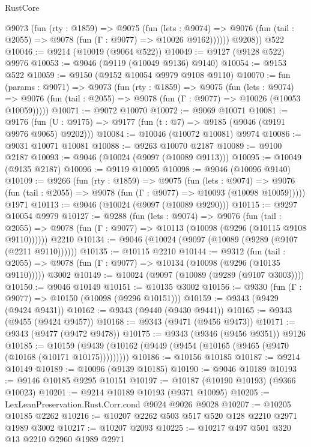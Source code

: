 \begin{lexlean}{RustCore}
\begin{coremodule}
          @9073
            (fun (rty : @1859) =>
            @9075
              (fun (lets : @9074) =>
              @9076 (fun (tail : @2055) => @9078 (fun (Γ : @9077) => @10026 @9162))))))
        @9208))
    @522
@10046 := @9214 (@10019 (@9064 @522))
@10049 := @9127 (@9128 @522) @9976
@10053 := @9046 (@9119 (@10049 @9136) @9140)
@10054 := @9153 @522
@10059 := @9150 (@9152 @10054 @9979 @9108 @9110)
@10070 := fun (params : @9071) =>
  @9073
    (fun (rty : @1859) =>
    @9075
      (fun (lets : @9074) =>
      @9076 (fun (tail : @2055) => @9078 (fun (Γ : @9077) => @10026 (@10053 @10059)))))
@10071 := @9072 @10070
@10072 := @9069 @10071
@10081 := @9176 (fun (U : @9175) => @9177 (fun (t : @7) => @9185 (@9046 (@9191 @9976 @9065) @9202)))
@10084 := @10046 (@10072 @10081) @9974
@10086 := @9031 @10071 @10081
@10088 := @9263 @10070 @2187
@10089 := @9100 @2187
@10093 := @9046 (@10024 (@9097 (@10089 @9113)))
@10095 := @10049 (@9135 @2187)
@10096 := @9119 @10095
@10098 := @9046 (@10096 @9140)
@10109 := @9266
    (fun (rty : @1859) =>
    @9075
      (fun (lets : @9074) =>
      @9076 (fun (tail : @2055) => @9078 (fun (Γ : @9077) => @10093 (@10098 @10059)))))
    @1971
@10113 := @9046 (@10024 (@9097 (@10089 @9290)))
@10115 := @9297 @10054 @9979
@10127 := @9288
    (fun (lets : @9074) =>
    @9076
      (fun (tail : @2055) =>
      @9078 (fun (Γ : @9077) => @10113 (@10098 (@9296 (@10115 @9108 @9110))))))
    @2210
@10134 := @9046 (@10024 (@9097 (@10089 (@9289 (@9107 (@2211 @9110))))))
@10135 := @10115 @2210
@10144 := @9312
    (fun (tail : @2055) => @9078 (fun (Γ : @9077) => @10134 (@10098 (@9296 (@10135 @9110)))))
    @3002
@10149 := @10024 (@9097 (@10089 (@9289 (@9107 @3003))))
@10150 := @9046 @10149
@10151 := @10135 @3002
@10156 := @9330 (fun (Γ : @9077) => @10150 (@10098 (@9296 @10151)))
@10159 := @9343 (@9429 (@9424 @9431))
@10162 := @9343 (@9440 (@9430 @9441))
@10165 := @9343 (@9455 (@9424 @9457))
@10168 := @9343 (@9471 (@9456 @9473))
@10171 := @9343 (@9477 (@9472 @9478))
@10175 := @9343 (@9346 (@9456 @9351)) @9126
@10185 := @10159 (@9439 (@10162 (@9449 (@9454 (@10165 (@9465 (@9470 (@10168 (@10171 @10175)))))))))
@10186 := @10156 @10185
@10187 := @9214 @10149
@10189 := @10096 (@9139 @10185)
@10190 := @9046 @10189
@10193 := @9146 @10185 @9295 @10151
@10197 := @10187 (@10190 @10193) (@9366 @10023)
@10201 := @9214 @10189 @10193 (@9371 @10095)
@10205 := LexLeanPreservation.Rust.Corr.cond @9024 @9026 @9028
@10207 := @10205 @10185 @2262
@10216 := @10207 @2262 @503 @517 @520 @128 @2210 @2971 @1989 @3002
@10217 := @10207 @2093
@10225 := @10217 @497 @501 @320 @13 @2210 @2960 @1989 @2971

\end{coremodule}
\end{lexlean}
